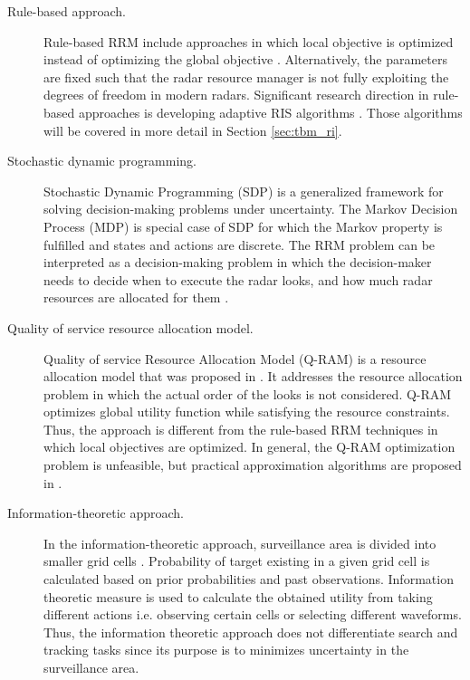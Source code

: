 \documentclass[english, 12pt, a4paper, elec, utf8, a-1b, online]{aaltothesis}
\begin{document}
\begin{description}

\item[Rule-based approach.]

Rule-based RRM include approaches in which local objective is optimized instead of optimizing the global objective \cite{Koch1999}.
Alternatively, the parameters are fixed such that the radar resource manager is not fully exploiting the degrees of freedom in modern radars.
Significant research direction in rule-based approaches is developing adaptive RIS algorithms \cite{Cohen1986, Gardner1988, Munu1992, ChengTing2007, Baek2010, Watson1993, Charlish2015, Keuk1975, Shin1995, Benoudnine2006, Esfahani2012, Zamani2017, Christiansen2018, Pilte2018}. Those algorithms will be covered in more detail in Section \ref{sec:tbm_ri}.


\item[Stochastic dynamic programming.]

Stochastic Dynamic Programming (SDP) is a generalized framework for solving decision-making problems under uncertainty. 
The  Markov Decision Process (MDP) is special case of SDP for which the Markov property is fulfilled and states and actions are discrete.
The RRM problem can be interpreted as a decision-making problem in which the decision-maker needs to decide when to execute the radar looks, and how much radar resources are allocated for them \cite{Krishnamurthy1999, Krishnamurthy2001, Wintenby2006, LaScala2006}.


\item[Quality of service resource allocation model.] 

Quality of service Resource Allocation Model (Q-RAM) is a resource allocation model that was proposed in \cite{Rajkumar1997}.
It addresses the resource allocation problem in which the actual order of the looks is not considered.
Q-RAM optimizes global utility function while satisfying the resource constraints.
Thus, the approach is different from the rule-based RRM techniques in which local objectives are optimized.
In general, the Q-RAM optimization problem is unfeasible, but practical approximation algorithms are proposed in \cite{Rajkumar1998, Irci2010, Charlish2015a}.

\item[Information-theoretic approach.]

In the information-theoretic approach, surveillance area is divided into smaller grid cells \cite{Kastella1997, Kreucher2004, Kreucher2005, Xu2010}.
Probability of target existing in a given grid cell is calculated based on prior probabilities and past observations.
Information theoretic measure is used to calculate the obtained utility from taking different actions i.e. observing certain cells or selecting different waveforms.
Thus, the information theoretic approach does not differentiate search and tracking tasks since its purpose is to minimizes uncertainty in the surveillance area.

\end{description}
\end{document}
